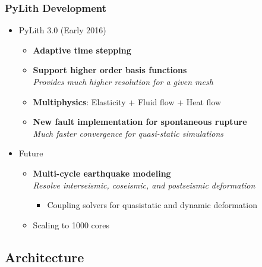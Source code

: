 \documentclass{beamer}
\newcommand{\important}[1]{{\color{red}#1}}
\begin{document}
\begin{frame}
  \frametitle{PyLith Development}
  
  \begin{itemize}
  \item \important{PyLith 3.0} (Early 2016)
    \begin{itemize}
    \item {\bf Adaptive time stepping}
    \item {\bf Support higher order basis functions} \\
      {\it Provides much higher resolution for a given mesh}
    \item {\bf Multiphysics}: Elasticity + Fluid flow + Heat flow
    \item {\bf New fault implementation for spontaneous rupture} \\
      {\it Much faster convergence for quasi-static simulations}
    \end{itemize}
  \item Future
    \begin{itemize}
    \item {\bf Multi-cycle earthquake modeling} \\
      {\it Resolve interseismic, coseismic, and postseismic deformation}
      \begin{itemize}
      \item Coupling solvers for quasistatic and dynamic deformation
      \end{itemize}
    \item Scaling to 1000 cores
    \end{itemize}
  \end{itemize}

\end{frame}


\subsection{Architecture}
\end{document}
